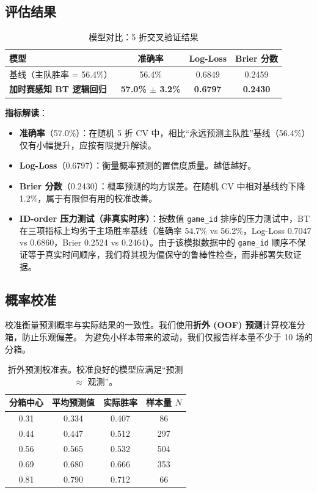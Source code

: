 \documentclass[11pt, a4paper]{article}
\begin{document}
\subsection{评估结果}

\begin{table}[H]
\centering
\caption{模型对比：5 折交叉验证结果}
\label{tab:cv}
\begin{tabular}{lccc}
\toprule
\textbf{模型} & \textbf{准确率} & \textbf{Log-Loss} & \textbf{Brier 分数} \\
\midrule
基线（主队胜率 = 56.4\%） & 56.4\% & 0.6849 & 0.2459 \\
\textbf{加时赛感知 BT 逻辑回归} & \textbf{57.0\% $\pm$ 3.2\%} & \textbf{0.6797} & \textbf{0.2430} \\
\bottomrule
\end{tabular}
\end{table}

\noindent\textbf{指标解读}：
\begin{itemize}
    \item \textbf{准确率}（57.0\%）：在随机 5 折 CV 中，相比``永远预测主队胜''基线（56.4\%）仅有小幅提升，应按有限提升解读。
    \item \textbf{Log-Loss}（0.6797）：衡量概率预测的置信度质量。越低越好。
    \item \textbf{Brier 分数}（0.2430）：概率预测的均方误差。在随机 CV 中相对基线约下降 1.2\%，属于有限但有用的校准改善。
    \item \textbf{ID-order 压力测试（非真实时序）}：按数值 \texttt{game\_id} 排序的压力测试中，BT 在三项指标上均劣于主场胜率基线（准确率 54.7\% vs 56.2\%，Log-Loss 0.7047 vs 0.6860，Brier 0.2524 vs 0.2464）。由于该模拟数据中的 \texttt{game\_id} 顺序不保证等于真实时间顺序，我们将其视为偏保守的鲁棒性检查，而非部署失败证据。
\end{itemize}

\subsection{概率校准}

校准衡量预测概率与实际结果的一致性。我们使用\textbf{折外 (OOF) 预测}计算校准分箱，防止乐观偏差。
为避免小样本带来的波动，我们仅报告样本量不少于 10 场的分箱。

\begin{table}[H]
\centering
\caption{折外预测校准表。校准良好的模型应满足``预测 $\approx$ 观测''。}
\label{tab:calibration}
\begin{tabular}{cccc}
\toprule
\textbf{分箱中心} & \textbf{平均预测值} & \textbf{实际胜率} & \textbf{样本量 $N$} \\
\midrule
0.31 & 0.334 & 0.407 & 86 \\
0.44 & 0.447 & 0.512 & 297 \\
0.56 & 0.565 & 0.532 & 504 \\
0.69 & 0.680 & 0.666 & 353 \\
0.81 & 0.790 & 0.712 & 66 \\
\bottomrule
\end{tabular}
\end{table}
\end{document}
